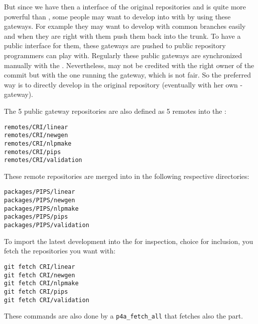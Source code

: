 \documentclass[a4paper]{article}
\begin{document}
But since we have then a \Agit interface of the original \Apips{} \Asvn
repositories and \Agit is quite more powerful than \Asvn, some people may
want to develop into \Apips with \Agit by using these gateways. For
example they may want to develop with common branches easily and when they
are right with them push them back into the \Apips{} \Asvn trunk. To have
a public interface for them, these \Agit gateways are pushed to public
\Agit repository programmers can play with. Regularly these public
gateways are synchronized manually with the \Apips{} \Asvn. Nevertheless,
\Asvn may not be credited with the right owner of the commit but with the
one running the gateway, which is not fair. So the preferred way is to
directly develop in the original \Apips \Asvn repository (eventually with
her own \Agit-\Asvn gateway).

The 5 public gateway \Agit repositories are also defined as 5 remotes into
the \Apfa{} \Agit:
\begin{description}
\item[\texttt{remotes/CRI/linear}]
\item[\texttt{remotes/CRI/newgen}]
\item[\texttt{remotes/CRI/nlpmake}]
\item[\texttt{remotes/CRI/pips}]
\item[\texttt{remotes/CRI/validation}]
\end{description}

These remote repositories are merged into \Apfa in the following
respective directories:
\begin{description}
\item[\texttt{packages/PIPS/linear}]
\item[\texttt{packages/PIPS/newgen}]
\item[\texttt{packages/PIPS/nlpmake}]
\item[\texttt{packages/PIPS/pips}]
\item[\texttt{packages/PIPS/validation}]
\end{description}

To import the latest \Apips development into the \Apfa{} \Agit for
inspection, choice for inclusion, you fetch the repositories you want
with:
\begin{verbatim}
git fetch CRI/linear
git fetch CRI/newgen
git fetch CRI/nlpmake
git fetch CRI/pips
git fetch CRI/validation
\end{verbatim}
These commands are also done by a \verb|p4a_fetch_all| that fetches also the
\Apolylib part.
\end{document}
